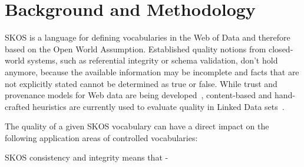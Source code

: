 
\section{Background and Methodology}


SKOS is a language for defining vocabularies in the Web of Data and therefore based on the Open World Assumption. Established quality notions from closed-world systems, such as referential integrity or schema validation, don’t hold anymore, because the available information may be incomplete and facts that are not explicitly stated cannot be determined as true or false. While trust and provenance models for Web data are being developed~\cite{Omitola2011,Hartig2009}, content-based and hand-crafted heuristics are currently used to evaluate quality in Linked Data sets~\cite{Heath2011}.

The quality of a given SKOS vocabulary can have a direct impact on the following application areas of controlled vocabularies: 

SKOS consistency and integrity means that
- 





